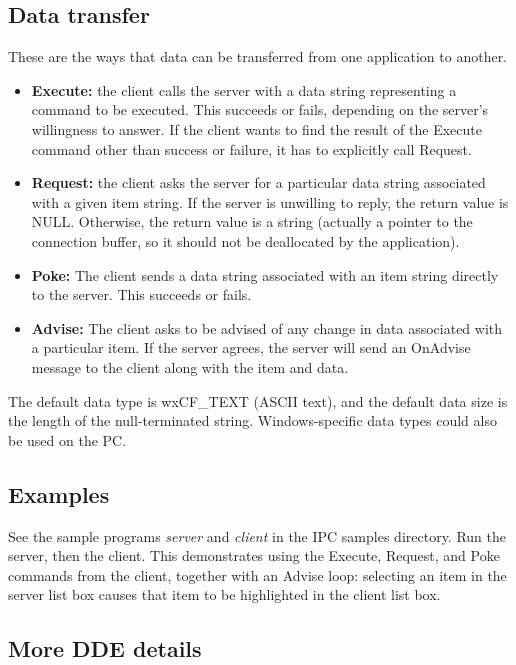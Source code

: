 \subsection{Data transfer}

These are the ways that data can be transferred from one application to
another.

\begin{itemize}\itemsep=0pt
\item {\bf Execute:} the client calls the server with a data string representing
a command to be executed. This succeeds or fails, depending on the
server's willingness to answer. If the client wants to find the result
of the Execute command other than success or failure, it has to explicitly
call Request.
\item {\bf Request:} the client asks the server for a particular data string
associated with a given item string. If the server is unwilling to
reply, the return value is NULL. Otherwise, the return value is a string
(actually a pointer to the connection buffer, so it should not be
deallocated by the application).
\item {\bf Poke:} The client sends a data string associated with an item
string directly to the server. This succeeds or fails.
\item {\bf Advise:} The client asks to be advised of any change in data
associated with a particular item. If the server agrees, the server will
send an OnAdvise message to the client along with the item and data.
\end{itemize}

The default data type is wxCF\_TEXT (ASCII text), and the default data
size is the length of the null-terminated string. Windows-specific data
types could also be used on the PC.

\subsection{Examples}

See the sample programs {\it server}\/ and {\it client}\/ in the IPC
samples directory.  Run the server, then the client. This demonstrates
using the Execute, Request, and Poke commands from the client, together
with an Advise loop: selecting an item in the server list box causes
that item to be highlighted in the client list box.

\subsection{More DDE details}

